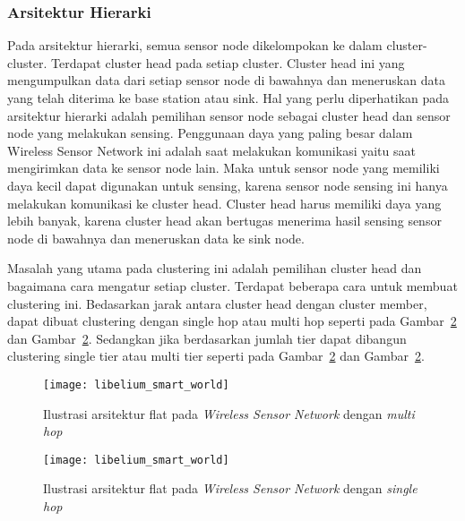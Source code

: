 \subsubsection{Arsitektur Hierarki}
Pada arsitektur hierarki, semua sensor node dikelompokan ke dalam cluster-cluster. Terdapat cluster head pada setiap cluster. Cluster head ini yang mengumpulkan data dari setiap sensor node di bawahnya dan meneruskan data yang telah diterima ke base station atau sink. Hal yang perlu diperhatikan pada arsitektur hierarki adalah pemilihan sensor node sebagai cluster head dan sensor node yang melakukan sensing. Penggunaan daya yang paling besar dalam Wireless Sensor Network ini adalah saat melakukan komunikasi yaitu saat mengirimkan data ke sensor node lain. Maka untuk sensor node yang memiliki daya kecil dapat digunakan untuk sensing, karena sensor node sensing ini hanya melakukan komunikasi ke cluster head. Cluster head harus memiliki daya yang lebih banyak, karena cluster head akan bertugas menerima hasil sensing sensor node di bawahnya dan meneruskan data ke sink node. 

Masalah yang utama pada clustering ini adalah pemilihan cluster head dan bagaimana cara mengatur setiap cluster. Terdapat beberapa cara untuk membuat clustering ini. Bedasarkan jarak antara cluster head dengan cluster member, dapat dibuat clustering dengan single hop atau multi hop seperti pada Gambar~\ref{fig:libelium_smart_world} dan Gambar~\ref{fig:libelium_smart_world}. Sedangkan jika berdasarkan jumlah tier dapat dibangun clustering single tier atau multi tier seperti pada Gambar~\ref{fig:libelium_smart_world} dan Gambar~\ref{fig:libelium_smart_world}.

\begin{figure} 
	\centering  
	\texttt{[image: libelium\_smart\_world]}  
	\caption[Ilustrasi arsitektur flat pada \textit{Wireless Sensor Network} dengan \textit{multi hop}]{Ilustrasi arsitektur flat pada \textit{Wireless Sensor Network} dengan \textit{multi hop}} 
	\label{fig:libelium_smart_world} 
\end{figure} 
\begin{figure} 
	\centering  
	\texttt{[image: libelium\_smart\_world]}  
	\caption[Ilustrasi arsitektur flat pada \textit{Wireless Sensor Network} dengan \textit{single hop}]{Ilustrasi arsitektur flat pada \textit{Wireless Sensor Network} dengan \textit{single hop}} 
	\label{fig:libelium_smart_world} 
\end{figure} 

